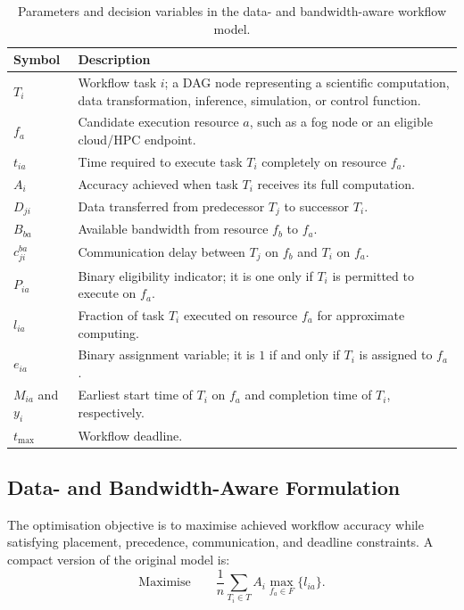 \begin{table}[t]
\centering
\caption{Parameters and decision variables in the data- and bandwidth-aware workflow model.}
\label{tab:continuum_variables}
\small
\begin{tabular}{p{}p{}}
\toprule
\textbf{Symbol} & \textbf{Description} \\
\midrule
$T_i$ & Workflow task $i$; a DAG node representing a scientific computation, data transformation, inference, simulation, or control function. \\
\addlinespace
$f_a$ & Candidate execution resource $a$, such as a fog node or an eligible cloud/HPC endpoint. \\
\addlinespace
$t_{ia}$ & Time required to execute task $T_i$ completely on resource $f_a$. \\
\addlinespace
$A_i$ & Accuracy achieved when task $T_i$ receives its full computation. \\
\addlinespace
$D_{ji}$ & Data transferred from predecessor $T_j$ to successor $T_i$. \\
\addlinespace
$B_{ba}$ & Available bandwidth from resource $f_b$ to $f_a$. \\
\addlinespace
$c_{ji}^{ba}$ & Communication delay between $T_j$ on $f_b$ and $T_i$ on $f_a$. \\
\addlinespace
$P_{ia}$ & Binary eligibility indicator; it is one only if $T_i$ is permitted to execute on $f_a$. \\
\addlinespace
$l_{ia}$ & Fraction of task $T_i$ executed on resource $f_a$ for approximate computing. \\
\addlinespace
$e_{ia}$ & Binary assignment variable; it is $1$ if and only if $T_i$ is assigned to $f_a$. \\
\addlinespace
$M_{ia}$ and $y_i$ & Earliest start time of $T_i$ on $f_a$ and completion time of $T_i$, respectively. \\
\addlinespace
$t_{\max}$ & Workflow deadline. \\
\bottomrule
\end{tabular}
\end{table}

\subsection{Data- and Bandwidth-Aware Formulation}

The optimisation objective is to maximise achieved workflow accuracy while satisfying placement, precedence, communication, and deadline constraints. A compact version of the original model is:
\begin{equation}
 \text{Maximise}\qquad \frac{1}{n}\sum_{T_i\in T} A_i\max_{f_a\in F}\{l_{ia}\}.
 \label{eq:continuum_objective}
\end{equation}


